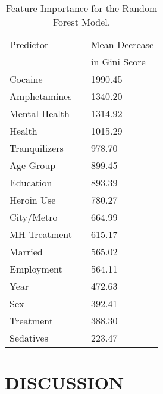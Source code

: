 \documentclass[sigconf]{acmart}
\begin{document}
\begin{table}
  \caption{Feature Importance for the Random Forest Model.}
  \label{tab:freq}
  \begin{tabular}{lll}
    \toprule
    Predictor&  & Mean Decrease  \\    
             &  & in Gini Score  \\
    \midrule
    Cocaine       &  &  1990.45 \\
    Amphetamines  &  &  1340.20 \\
    Mental Health &  &  1314.92 \\ 
    Health        &  &  1015.29 \\
    Tranquilizers &  &   978.70 \\
    Age Group     &  &   899.45 \\
    Education     &  &   893.39 \\
    Heroin Use    &  &   780.27 \\
    City/Metro    &  &   664.99 \\
    MH Treatment  &  &   615.17 \\
    Married       &  &   565.02 \\
    Employment    &  &   564.11 \\ 
    Year          &  &   472.63 \\
    Sex           &  &   392.41 \\
    Treatment     &  &   388.30 \\
    Sedatives     &  &   223.47 \\
    \bottomrule
  \end{tabular}
\end{table}



\section{DISCUSSION}
\end{document}
